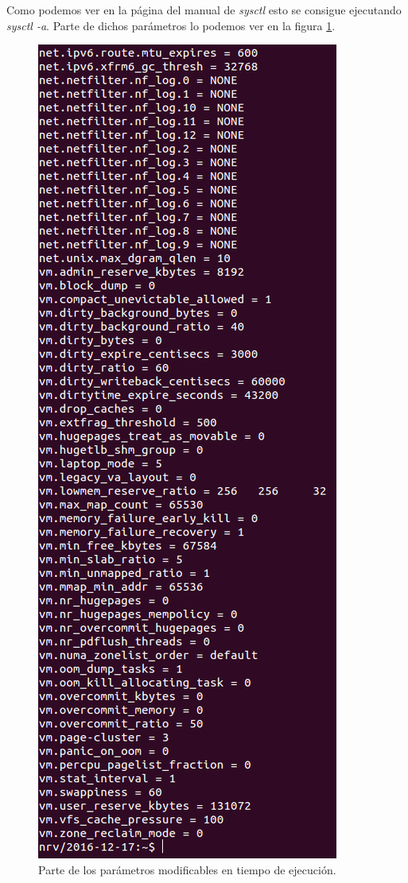 \documentclass[a4paper,titlepage,12pt]{scrartcl}	%
\numberwithin{figure}{section} %
\numberwithin{table}{section} %
\begin{document}
	Como podemos ver en la página del manual de \textit{sysctl} \cite{sysctl_man} esto se consigue ejecutando \textit{sysctl -a}. Parte de dichos parámetros lo podemos ver en la figura \ref{2-1}.
	
	\begin{figure}[H]
		\centering
		\includegraphics[scale=0.4]{./Imagenes/2-1.png}
		\caption[Parte de los parámetros modificables en tiempo de ejecución.]{Parte de los parámetros modificables en tiempo de ejecución.}
		\label{2-1}
	\end{figure}
	
\end{document}
